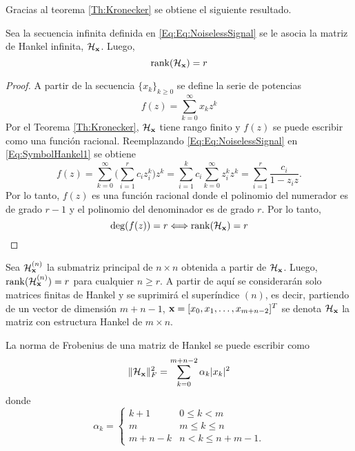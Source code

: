         Gracias al teorema \eqref{Th:Kronecker} se obtiene el siguiente resultado.
        \begin{theorem}\label{Th:Kronecker2}
            Sea la secuencia infinita definida en  \eqref{Eq:Eq:NoiselessSignal} se le asocia la matriz de Hankel infinita, $\mathcal{H}_{\mathbf{x}}$. Luego,
            \begin{equation}
                \mathrm{rank}(\mathcal{H}_{\mathbf{x}}) = r
                \label{Eq:Kronecker2}
            \end{equation}
        \end{theorem}
        \begin{proof}
            A partir de la secuencia $\{x_k\}_{k\ge 0}$ se define la serie de potencias 
	       	\begin{equation}
			    f(z) = \sum_{k=0}^\infty x_k z^{k}
			    \label{Eq:SymbolHankel1}
		      \end{equation}
            Por el Teorema \eqref{Th:Kronecker}, $\mathcal{H}_{\mathbf{x}}$ tiene rango finito y $f(z)$ se puede escribir como una función racional. Reemplazando \eqref{Eq:Eq:NoiselessSignal} en \eqref{Eq:SymbolHankel1} se obtiene
            \begin{equation}
                f(z) = \sum_{k=0}^\infty\bigg(\sum_{i=1}^rc_iz_i^k\bigg)z^k = \sum_{i=1}^kc_i\sum_{k=0}^{\infty}z_i^kz^k = \sum_{i=1}^r\frac{c_i}{1-z_iz}.
                \label{Eq:ExpModel1}
            \end{equation}
            Por lo tanto, $f(z)$ es una función racional donde el polinomio del numerador es de grado $r-1$ y el polinomio del denominador es de grado $r$. Por lo tanto,
            \begin{equation}
                \deg(f(z))=r \Longleftrightarrow \mathrm{rank}(\mathcal{H}_{\mathbf{x}}) = r
                \label{Eq:KroneckerResult}
            \end{equation}
        \end{proof}
        Sea $\mathcal{H}_{\mathbf{x}}^{(n)}$ la submatriz principal de $n\times n$ obtenida a partir de $\mathcal{H}_{\mathbf{x}}$. Luego, $\mathrm{rank}(\mathcal{H}_{\mathbf{x}}^{(n)}) = r$ para cualquier $n\geq r$. A partir de aquí se considerarán solo matrices finitas de Hankel y se suprimirá el superíndice $(n)$, es decir, partiendo de un vector de dimensión $m+n-1$, $\mathbf{x} = [x_0,x_1,\ldots,x_{m+n-2}]^T$ se denota $\mathcal{H}_{\mathbf{x}}$ la matriz con estructura Hankel de $m\times n$. 
        
        \begin{definition}\label{Def:NormFrobeniusHankel}
			La norma de Frobenius de una matriz de Hankel se puede escribir como
			\begin{equation}
				\|\mathcal{H}_{\mathbf{x}}\|_F^2 = \sum_{k=0}^{m+n-2}\alpha_k|x_k|^2
				\label{Eq:Frobnorm}
			\end{equation}
			donde
			\[\alpha_k = \begin{cases} k+1 &  0 \leq k < m\\
			m &  m \leq k \leq n\\
			m+n-k & n < k \leq n+m-1.
			\end{cases}\]
		\end{definition}
        
